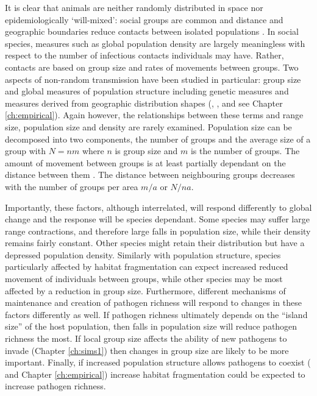 It is clear that animals are neither randomly distributed in space nor epidemiologically `will-mixed': social groups are common \cite{kerth2008causes} and distance and geographic boundaries reduce contacts between isolated populations \cite{jenkins2010meta, peel2012henipavirus}.
In social species, measures such as global population density are largely meaningless with respect to the number of infectious contacts individuals may have.
Rather, contacts are based on group size and rates of movements between groups.
Two aspects of non-random transmission have been studied in particular: group size \cite{vitone2004body, gay2014parasite, ezenwa2006host, rifkin2012animals, nunn2003comparative} and global measures of population structure including genetic measures and measures derived from geographic distribution shapes (\textcite{gay2014parasite}, \textcite{maganga2014bat}, \textcite{turmelle2009correlates} and see Chapter \ref{ch:empirical}).
Again however, the relationships between these terms and range size, population size and density are rarely examined.
Population size can be decomposed into two components, the number of groups and the average size of a group with $N = nm$ where $n$ is group size and $m$ is the number of groups.
The amount of movement between groups is at least partially dependant on the distance between them \cite{jenkins2010meta, le2012patterns, schooley2009enhancing}.
The distance between neighbouring groups decreases with the number of groups per area $m/a$ or $N/na$.


Importantly, these factors, although interrelated, will respond differently to global change and the response will be species dependant.
Some species may suffer large range contractions, and therefore large falls in population size, while their density remains fairly constant.
Other species might retain their distribution but have a depressed population density.
Similarly with population structure, species particularly affected by habitat fragmentation can expect increased reduced movement of individuals between groups, while other species may be most affected by a reduction in group size.
Furthermore, different mechanisms of maintenance and creation of pathogen richness will respond to changes in these factors differently as well.
If pathogen richness ultimately depends on the ``island size'' of the host population, then falls in population size will reduce pathogen richness the most.
If local group size affects the ability of new pathogens to invade (Chapter \ref{ch:sims1}) then changes in group size are likely to be more important.
Finally, if increased population structure allows pathogens to coexist (\parencite{qiu2013vector, allen2004sis, nunes2006localized} and Chapter \ref{ch:empirical}) increase habitat fragmentation could be expected to increase pathogen richness.

